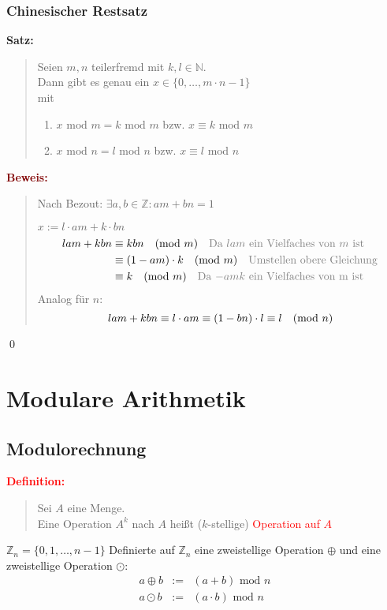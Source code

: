 \documentclass{article}
\newcommand{\mesp}{\phantom{\hspace{10px}}}
\newcommand{\red}[1]{\textcolor{red}{#1}}
\newcommand{\gray}[1]{\textcolor{gray}{#1}}
\newcommand{\dgr}[1]{\textcolor{dgr}{#1}}
\newcommand{\maroon}[1]{\textcolor{maroon}{#1}}
\newcommand{\de}[1]{\red{\textbf{Definition: }}\begin{quote}#1\end{quote}}
\newcommand{\se}[1]{\dgr{\textbf{Satz: }}\begin{quote}#1\end{quote}}
\newcommand{\pr}[1]{\maroon{\textbf{Beweis: }}\begin{quote}#1\end{quote}\qed}
\newcommand{\N}{\mathbb{N}}
\newcommand{\Z}{\mathbb{Z}}
\renewcommand{\mod}{\text{ mod }}
\begin{document}
\newpage
\subsubsection{Chinesischer Restsatz}
\se{
    Seien $m,n$ teilerfremd mit $k,l \in \N$.\\
    Dann gibt es genau ein $x \in \{0, \dots, m \cdot n - 1\}$\\
    mit \begin{enumerate}
        \item $x \mod m = k \mod m$ bzw. $x \equiv k \mod m$
        \item $x \mod n = l \mod n$ bzw. $x \equiv l \mod n$
    \end{enumerate}
}
\pr{
    Nach Bezout: $\exists a,b \in \Z: am + bn = 1$

    $x := l \cdot am + k \cdot bn$
    \begin{align*}
        lam + kbn &\equiv kbn \mesp (\text{mod } m) \mesp \text{\gray{Da $lam$ ein Vielfaches von $m$ ist}}\\
        &\equiv (1 - am) \cdot k \mesp (\text{mod } m) \mesp \text{\gray{Umstellen obere Gleichung}}\\
        &\equiv k \mesp (\text{mod } m) \mesp \text{\gray{Da $-amk$ ein Vielfaches von m ist}}\\
    \end{align*}
    Analog für $n$:
    \[
        lam + kbn \equiv l \cdot am \equiv (1-bn) \cdot l \equiv l \mesp (\text{mod } n)
    \]
}

\section{Modulare Arithmetik}

\subsection{Modulorechnung}

\de{
    Sei $A$ eine Menge.\\
    Eine Operation $A^k$ nach $A$ heißt ($k$-stellige) \red{Operation auf $A$}
}
$\Z_n = \{0, 1, \dots, n-1\}$
Definierte auf $\Z_n$ eine zweistellige Operation $\oplus$ und eine zweistellige Operation $\odot$:
\[
    \begin{array}{lcl}
        a \oplus b &:=& (a + b) \mod n\\
        a \odot b &:=& (a \cdot b) \mod n
    \end{array}
\]
\end{document}
